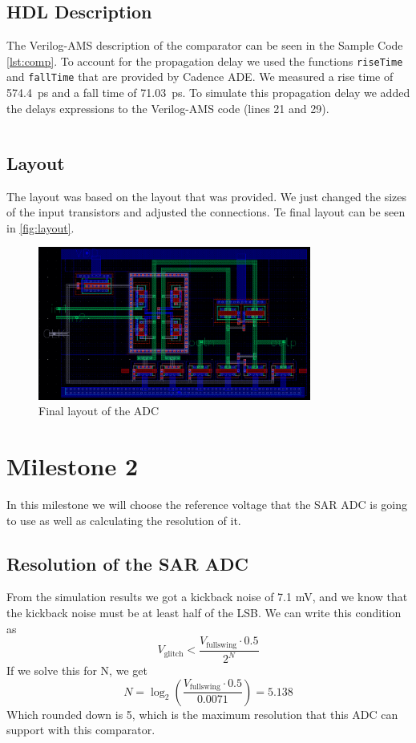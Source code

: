 \documentclass{article}
\newcommand*{\subb}[1]{\ensuremath{_{\mathrm{#1}}}}
\begin{document}
 \subsection{HDL Description}
 The Verilog-AMS description of the comparator can be seen in the Sample Code \ref{lst:comp}. To account for the propagation delay we used the functions \texttt{riseTime} and \texttt{fallTime} that are provided by Cadence ADE. We measured a rise time of \SI{574.4}{\ps} and a fall time of \SI{71.03}{\ps}. To simulate this propagation delay we added the delays expressions to the Verilog-AMS code (lines 21 and 29).
  \inputminted{verilog}{../milestone1/comparator/comp_v2/verilogams/verilog.vams}
 
 \subsection{Layout}
 The layout was based on the layout that was provided. We just changed the sizes of the input transistors and adjusted the connections. Te final layout can be seen in \autoref{fig:layout}.

 \begin{figure}[h]
  \centering
  \includegraphics[angle=90, width=0.8\textwidth]{img/layout}
  \caption{Final layout of the ADC}
  \label{fig:layout}
 \end{figure}
 \section*{Milestone 2}
 \setcounter{section}{2}
 \setcounter{subsection}{0}
 In this milestone we will choose the reference voltage that the SAR ADC is going to use as well as calculating the resolution of it.
 \subsection{Resolution of the SAR ADC}
 From the simulation results we got a kickback noise of 7.1 mV, and we know that the kickback noise must be at least half of the LSB. We can write this condition as
 \begin{equation}
  V\subb{glitch} < \frac{V\subb{full swing}\cdot 0.5}{2^N}
 \end{equation}
 If we solve this for N, we get
 \begin{equation}
  N=\log_2\!\left(\frac{V\subb{full swing}\cdot 0.5}{0.0071}\right)=5.138
 \end{equation}
 Which rounded down is 5, which is the maximum resolution that this ADC can support with this comparator.
\end{document}
